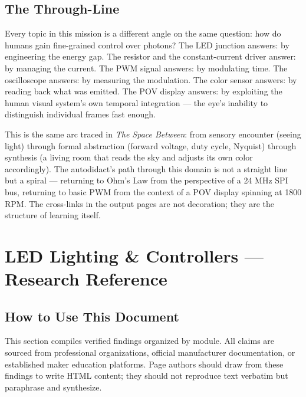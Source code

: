 \documentclass[11pt,letterpaper]{article}
\newcommand{\stageheader}[2]{%
  \noindent\colorbox{#2}{\makebox[\textwidth][l]{%
    \textcolor{white}{\bfseries\sffamily\hspace{6pt}#1\hspace{6pt}}}}%
  \vspace{0.5em}\par%
}
\begin{document}
\subsection{The Through-Line}

Every topic in this mission is a different angle on the same question: how do humans gain fine-grained control over photons? The LED junction answers: by engineering the energy gap. The resistor and the constant-current driver answer: by managing the current. The PWM signal answers: by modulating time. The oscilloscope answers: by measuring the modulation. The color sensor answers: by reading back what was emitted. The POV display answers: by exploiting the human visual system's own temporal integration --- the eye's inability to distinguish individual frames fast enough.

This is the same arc traced in \textit{The Space Between}: from sensory encounter (seeing light) through formal abstraction (forward voltage, duty cycle, Nyquist) through synthesis (a living room that reads the sky and adjusts its own color accordingly). The autodidact's path through this domain is not a straight line but a spiral --- returning to Ohm's Law from the perspective of a 24 MHz SPI bus, returning to basic PWM from the context of a POV display spinning at 1800 RPM. The cross-links in the output pages are not decoration; they are the structure of learning itself.

\newpage
\stageheader{STAGE 2 --- RESEARCH REFERENCE}{secondary}

\section{LED Lighting \& Controllers --- Research Reference}

\subsection{How to Use This Document}

This section compiles verified findings organized by module. All claims are sourced from professional organizations, official manufacturer documentation, or established maker education platforms. Page authors should draw from these findings to write HTML content; they should not reproduce text verbatim but paraphrase and synthesize.
\end{document}
